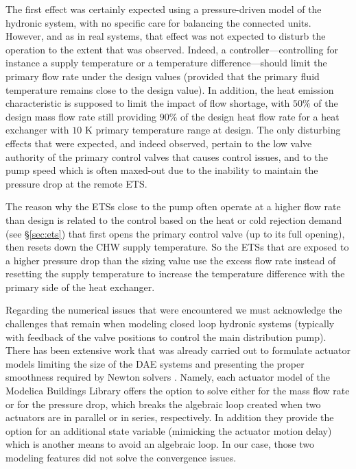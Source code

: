 The first effect was certainly expected using a pressure-driven model of the hydronic system, with no specific care for balancing the connected units. However, and as in real systems, that effect was not expected to disturb the operation to the extent that was observed. Indeed, a controller---controlling for instance a supply temperature or a temperature difference---should limit the primary flow rate under the design values (provided that the primary fluid temperature remains close to the design value). In addition, the heat emission characteristic is supposed to limit the impact of flow shortage, with $50\%$ of the design mass flow rate still providing $90\%$ of the design heat flow rate for a heat exchanger with $10$ K primary temperature range at design. The only disturbing effects that were expected, and indeed observed, pertain to the low valve authority of the primary control valves that causes control issues, and to the pump speed which is often maxed-out due to the inability to maintain the pressure drop at the remote ETS.

The reason why the ETSs close to the pump often operate at a higher flow rate than design is related to the control based on the heat or cold rejection demand (see §\ref{sec:ets}) that first opens the primary control valve (up to its full opening), then resets down the CHW supply temperature. So the ETSs that are exposed to a higher pressure drop than the sizing value use the excess flow rate instead of resetting the supply temperature to increase the temperature difference with the primary side of the heat exchanger.

Regarding the numerical issues that were encountered we must acknowledge the challenges that remain when modeling closed loop hydronic systems (typically with feedback of the valve positions to control the main distribution pump).
There has been extensive work that was already carried out to formulate actuator models limiting the size of the DAE systems and presenting the proper smoothness required by Newton solvers \cite{Jorissen2015}.
Namely, each actuator model of the Modelica Buildings Library offers the option to solve either for the mass flow rate or for the pressure drop, which breaks the algebraic loop created when two actuators are in parallel or in series, respectively. In addition they provide the option for an additional state variable (mimicking the actuator motion delay) which is another means to avoid an algebraic loop.
In our case, those two modeling features did not solve the convergence issues.

